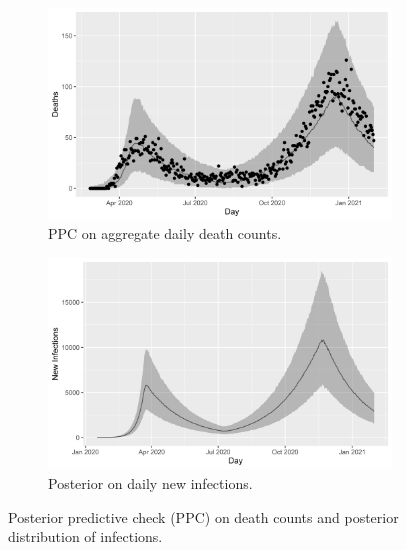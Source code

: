 \documentclass[11pt]{amsart}
\numberwithin{equation}{section}
\theoremstyle{plain}
\begin{document}
\begin{figure}[!th]
 \centering
 \begin{subfigure}{.5\textwidth}
  \centering
  \includegraphics[width=.9\linewidth]{../figs/deaths_ppc.png}
 \caption{PPC on aggregate daily death counts.}
 \label{fig:deathsppc}
 \end{subfigure}%
 \begin{subfigure}{.5\textwidth}
  \centering
  \includegraphics[width=.9\linewidth]{../figs/infections_ppc.png}
 \caption{Posterior on daily new infections.}
 \label{fig:casesppc}
 \end{subfigure}
 \caption{Posterior predictive check (PPC) on death counts and posterior distribution of infections.}
 \label{fig:ppcs}
 \end{figure}
\end{document}
